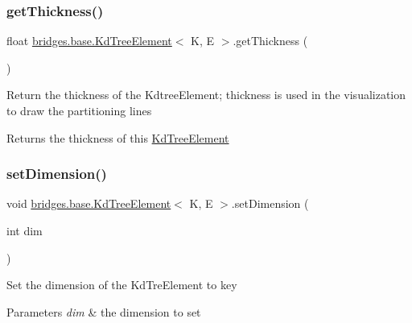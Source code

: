 \subsubsection{\texorpdfstring{get\+Thickness()}{getThickness()}}
{\footnotesize\ttfamily float \hyperlink{classbridges_1_1base_1_1_kd_tree_element}{bridges.\+base.\+Kd\+Tree\+Element}$<$ K, E $>$.get\+Thickness (\begin{DoxyParamCaption}{ }\end{DoxyParamCaption})}

Return the thickness of the Kdtree\+Element; thickness is used in the visualization to draw the partitioning lines

\begin{DoxyReturn}{Returns}
the thickness of this \hyperlink{classbridges_1_1base_1_1_kd_tree_element}{Kd\+Tree\+Element} 
\end{DoxyReturn}
\mbox{\label{classbridges_1_1base_1_1_kd_tree_element_af3fa89cbd20fc2c3f30784db16b6dec4}} 
\subsubsection{\texorpdfstring{set\+Dimension()}{setDimension()}}
{\footnotesize\ttfamily void \hyperlink{classbridges_1_1base_1_1_kd_tree_element}{bridges.\+base.\+Kd\+Tree\+Element}$<$ K, E $>$.set\+Dimension (\begin{DoxyParamCaption}\item[{int}]{dim }\end{DoxyParamCaption})}

Set the dimension of the Kd\+Tre\+Element to key 
\begin{DoxyParams}{Parameters}
{\em dim} & the dimension to set \\
\hline
\end{DoxyParams}
\mbox{\label{classbridges_1_1base_1_1_kd_tree_element_a4ac77d4bd2a103a8aa89514aa2f0cf66}} 
